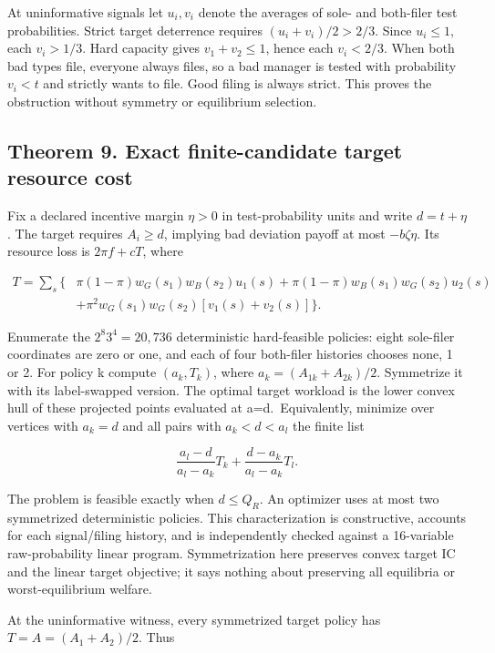 \documentclass[
  11pt,
]{article}
\begin{document}
At uninformative signals let \(u_i,v_i\) denote the averages of sole-
and both-filer test probabilities. Strict target deterrence requires
\((u_i+v_i)/2>2/3\). Since \(u_i\leq1\), each \(v_i>1/3\). Hard capacity
gives \(v_1+v_2\leq1\), hence each \(v_i<2/3\). When both bad types
file, everyone always files, so a bad manager is tested with probability
\(v_i<t\) and strictly wants to file. Good filing is always strict. This
proves the obstruction without symmetry or equilibrium selection.

\subsection{Theorem 9. Exact finite-candidate target resource
cost}\label{theorem-9.-exact-finite-candidate-target-resource-cost}

Fix a declared incentive margin \(\eta>0\) in test-probability units and
write \(d=t+\eta\). The target requires \(A_i\geq d\), implying bad
deviation payoff at most \(-b\zeta\eta\). Its resource loss is
\(2\pi f+cT\), where

\[\begin{split}
T=\sum_s\{&\pi(1-\pi)w_G(s_1)w_B(s_2)u_1(s)
+\pi(1-\pi)w_B(s_1)w_G(s_2)u_2(s)\\
&+\pi^2w_G(s_1)w_G(s_2)[v_1(s)+v_2(s)]\}.
\end{split}\]

Enumerate the \(2^8 3^4=20,736\) deterministic hard-feasible policies:
eight sole-filer coordinates are zero or one, and each of four
both-filer histories chooses none, 1 or 2. For policy k compute
\((a_k,T_k)\), where \(a_k=(A_{1k}+A_{2k})/2\). Symmetrize it with its
label-swapped version. The optimal target workload is the lower convex
hull of these projected points evaluated at a=d.~Equivalently, minimize
over vertices with \(a_k=d\) and all pairs with \(a_k<d<a_l\) the finite
list

\[\frac{a_l-d}{a_l-a_k}T_k+\frac{d-a_k}{a_l-a_k}T_l.\]

The problem is feasible exactly when \(d\leq Q_R\). An optimizer uses at
most two symmetrized deterministic policies. This characterization is
constructive, accounts for each signal/filing history, and is
independently checked against a 16-variable raw-probability linear
program. Symmetrization here preserves convex target IC and the linear
target objective; it says nothing about preserving all equilibria or
worst-equilibrium welfare.

At the uninformative witness, every symmetrized target policy has
\(T=A=(A_1+A_2)/2\). Thus
\end{document}
